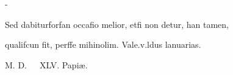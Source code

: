 \begin{adjustwidth*}{\unitlength}{-\unitlength}
\begin{adjustwidth}{-0.5cm}{-0.5cm}
\hspace{9mm}Sed dabiturforfan occafio melior, etfi non detur, han tamen,

\hspace{12mm}qualifcun{\que} fit, per{\nb}ffe mihinolim. Vale.v.ldus lanuarias.

\hspace{55mm}M. D.~~~XLV. Papi{\ae}.
	\end{adjustwidth}
\end{adjustwidth*}
\normalfont
\normalsize